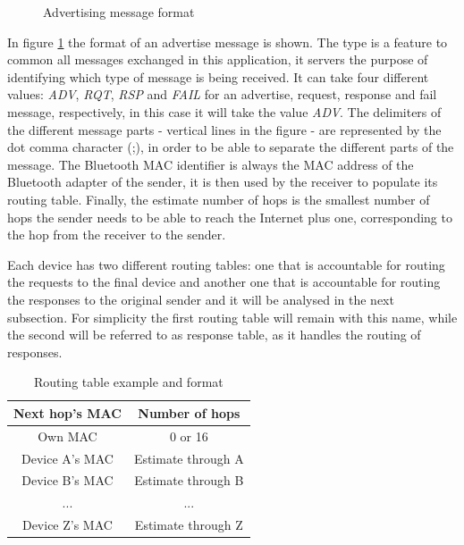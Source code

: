 \begin{figure}[ht]
   \noindent{}
	\caption{\label{fig:advmsg} Advertising message format}
\end{figure}

In figure \ref{fig:advmsg} the format of an advertise message is shown. The type is a feature to common all messages exchanged in this application, it servers the purpose of identifying which type of message is being received. It can take four different values: \textit{ADV}, \textit{RQT}, \textit{RSP} and \textit{FAIL} for an advertise, request, response and fail message, respectively, in this case it will take the value \textit{ADV}. The delimiters of the different message parts - vertical lines in the figure - are represented by the dot comma character (;), in order to be able to separate the different parts of the message. The Bluetooth \gls{MAC} identifier is always the \gls{MAC} address of the Bluetooth adapter of the sender, it is then used by the receiver to populate its routing table. Finally, the estimate number of hops is the smallest number of hops the sender needs to be able to reach the Internet plus one, corresponding to the hop from the receiver to the sender.

Each device has two different routing tables: one that is accountable for routing the requests to the final device and another one that is accountable for routing the responses to the original sender and it will be analysed in the next subsection. For simplicity the first routing table will remain with this name, while the second will be referred to as response table, as it handles the routing of responses.

\begin{table}[ht]
\centering
\bgroup
\def\arraystretch{2.5}
\begin{tabular}{|c|c|}
\hline
\textbf{Next hop's MAC} & \textbf{Number of hops} \\ \hline
Own MAC & 0 or 16 \\ \hline
Device A's MAC & Estimate through A \\ \hline
Device B's MAC & Estimate through B \\ \hline
... & ... \\ \hline
Device Z's MAC & Estimate through Z \\ \hline
\end{tabular}
\egroup
\caption{Routing table example and format}
\label{tab:routTables}
\end{table}

